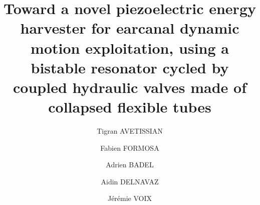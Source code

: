 \documentclass[3p,twocolumn,preprint]{elsarticle}
\begin{document}

\begin{frontmatter}



\title{Toward a novel piezoelectric energy harvester for earcanal dynamic motion exploitation, using a bistable resonator cycled by coupled hydraulic valves made of collapsed flexible tubes}



\address[symme]{Laboratoire SYMME - Université Savoie Mont Blanc, 7 Chemin de Bellevue, 74940, Annecy}
\address[critias]{Université du Québec - École de technologie supérieure, Montréal, QC, H3C 1K3}


\author[symme]{Tigran AVETISSIAN}
\author[symme]{Fabien FORMOSA}
\author[symme]{Adrien BADEL}

\author[critias]{Aidin DELNAVAZ}
\author[critias]{Jérémie VOIX}



\end{frontmatter}
\end{document}
